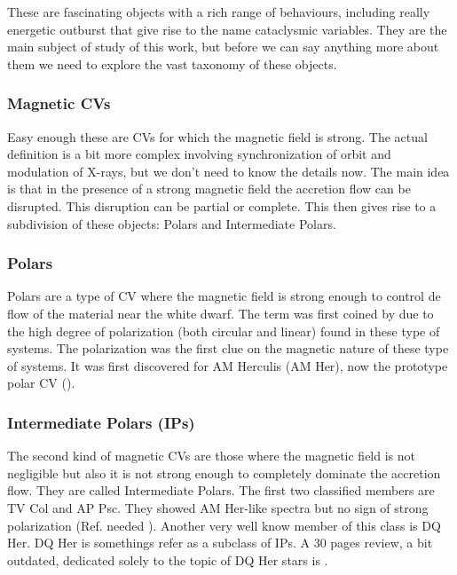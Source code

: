 These are fascinating objects with a rich range of behaviours, including really energetic outburst that give rise to the name cataclysmic variables. They are the main subject of study of this work, but before we can say anything more about them we need to explore the vast taxonomy of these objects. %

\subsubsection{Magnetic CVs}

Easy enough these are CVs for which the magnetic field is strong. The actual definition is a bit more complex involving synchronization of orbit and modulation of X-rays, but we don't need to know the details now. The main idea is that in the presence of a strong magnetic field the accretion flow can be disrupted. This disruption can be partial or complete. This then gives rise to a subdivision of these objects: Polars and Intermediate Polars.  

\subsubsection{Polars}

Polars are a type of CV where the magnetic field is strong enough to control de flow of the material near the white dwarf. The term was first coined by \cite{krzeminski_extremely_1977} due to the high degree of polarization (both circular and linear) found in these type of systems. The polarization was the first clue on the magnetic nature of these type of systems. It was first discovered for AM Herculis (AM Her), now the prototype polar CV (\cite{tapia_discovery_1977}). \\



\subsubsection{Intermediate Polars (IPs)}

The second kind of magnetic CVs are those where the magnetic field is not negligible but also it is not strong enough to completely dominate the accretion flow. They are called Intermediate Polars. The first two classified members are TV Col and AP Psc. They showed AM Her-like spectra but no sign of strong polarization (Ref. needed \cite{ref}). Another very well know member of this class is DQ Her. DQ Her is somethings refer as a subclass of IPs. A 30 pages review, a bit outdated, dedicated solely to the topic of DQ Her stars is \cite{patterson_dq_1994}. \\ 


